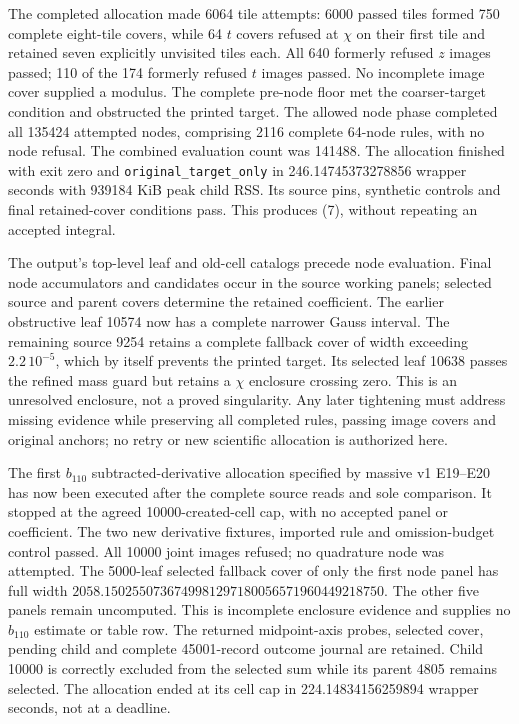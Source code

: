 \documentclass[10pt]{article}
\begin{document}
The completed allocation made 6064 tile attempts: 6000
passed tiles formed 750 complete eight-tile covers, while
64 $t$ covers refused at $\chi$ on their first tile and
retained seven explicitly unvisited tiles each.
All 640 formerly refused $z$ images passed; 110 of the
174 formerly refused $t$ images passed. No incomplete image
cover supplied a modulus. The complete pre-node floor met
the coarser-target condition and obstructed the printed
target. The allowed node phase completed all 135424 attempted
nodes, comprising 2116 complete 64-node rules, with no node
refusal. The combined evaluation count was 141488.
The allocation finished with exit zero and
\texttt{original\_target\_only} in 246.14745373278856 wrapper
seconds with 939184 KiB peak child RSS. Its source pins,
synthetic controls and final retained-cover conditions pass.
This produces (7), without repeating an accepted integral.

The output's top-level leaf and old-cell catalogs precede
node evaluation. Final node accumulators and candidates occur
in the source working panels; selected source and parent
covers determine the retained coefficient. The earlier
obstructive leaf 10574 now has a complete narrower Gauss
interval. The remaining source 9254 retains a complete
fallback cover of width exceeding $2.2\,10^{-5}$, which by
itself prevents the printed target. Its selected leaf 10638
passes the refined mass guard but retains a $\chi$ enclosure
crossing zero. This is an unresolved enclosure, not a proved
singularity. Any later tightening must address missing
evidence while preserving all completed rules, passing
image covers and original anchors; no retry or new
scientific allocation is authorized here.

The first $b_{110}$ subtracted-derivative allocation specified by
massive v1 E19--E20 has now been executed after the complete
source reads and sole comparison. It stopped at the agreed
10000-created-cell cap, with no accepted panel or coefficient.
The two new derivative fixtures, imported rule and omission-budget
control passed. All 10000 joint images refused; no quadrature node
was attempted. The 5000-leaf selected fallback cover of only the
first node panel has full width
$2058.1502550736749981297180056571960449218750$.
The other five panels remain uncomputed. This is incomplete
enclosure evidence and supplies no $b_{110}$ estimate or table row.
The returned midpoint-axis probes, selected cover, pending child
and complete 45001-record outcome journal are retained. Child
10000 is correctly excluded from the selected sum while its
parent 4805 remains selected. The allocation ended at its cell cap
in 224.14834156259894 wrapper seconds, not at a deadline.
\end{document}
